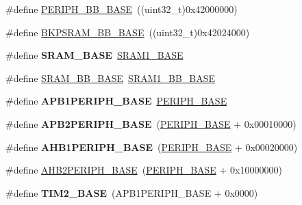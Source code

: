 \begin{DoxyCompactItemize}
\item 
\#define \hyperlink{group___peripheral__memory__map_gaed7efc100877000845c236ccdc9e144a}{P\-E\-R\-I\-P\-H\-\_\-\-B\-B\-\_\-\-B\-A\-S\-E}~((uint32\-\_\-t)0x42000000)
\item 
\#define \hyperlink{group___peripheral__memory__map_gaee19a30c9fa326bb10b547e4eaf4e250}{B\-K\-P\-S\-R\-A\-M\-\_\-\-B\-B\-\_\-\-B\-A\-S\-E}~((uint32\-\_\-t)0x42024000)
\item 
\hypertarget{group___peripheral__memory__map_ga05e8f3d2e5868754a7cd88614955aecc}{\#define {\bfseries S\-R\-A\-M\-\_\-\-B\-A\-S\-E}~\hyperlink{group___peripheral__memory__map_ga7d0fbfb8894012dbbb96754b95e562cd}{S\-R\-A\-M1\-\_\-\-B\-A\-S\-E}}\label{group___peripheral__memory__map_ga05e8f3d2e5868754a7cd88614955aecc}

\item 
\#define \hyperlink{group___peripheral__memory__map_gad3548b6e2f017f39d399358f3ac98454}{S\-R\-A\-M\-\_\-\-B\-B\-\_\-\-B\-A\-S\-E}~\hyperlink{group___peripheral__memory__map_gac4c4f61082e4b168f29d9cf97dc3ca5c}{S\-R\-A\-M1\-\_\-\-B\-B\-\_\-\-B\-A\-S\-E}
\item 
\hypertarget{group___peripheral__memory__map_ga45666d911f39addd4c8c0a0ac3388cfb}{\#define {\bfseries A\-P\-B1\-P\-E\-R\-I\-P\-H\-\_\-\-B\-A\-S\-E}~\hyperlink{group___peripheral__memory__map_ga9171f49478fa86d932f89e78e73b88b0}{P\-E\-R\-I\-P\-H\-\_\-\-B\-A\-S\-E}}\label{group___peripheral__memory__map_ga45666d911f39addd4c8c0a0ac3388cfb}

\item 
\hypertarget{group___peripheral__memory__map_ga25b99d6065f1c8f751e78f43ade652cb}{\#define {\bfseries A\-P\-B2\-P\-E\-R\-I\-P\-H\-\_\-\-B\-A\-S\-E}~(\hyperlink{group___peripheral__memory__map_ga9171f49478fa86d932f89e78e73b88b0}{P\-E\-R\-I\-P\-H\-\_\-\-B\-A\-S\-E} + 0x00010000)}\label{group___peripheral__memory__map_ga25b99d6065f1c8f751e78f43ade652cb}

\item 
\hypertarget{group___peripheral__memory__map_ga811a9a4ca17f0a50354a9169541d56c4}{\#define {\bfseries A\-H\-B1\-P\-E\-R\-I\-P\-H\-\_\-\-B\-A\-S\-E}~(\hyperlink{group___peripheral__memory__map_ga9171f49478fa86d932f89e78e73b88b0}{P\-E\-R\-I\-P\-H\-\_\-\-B\-A\-S\-E} + 0x00020000)}\label{group___peripheral__memory__map_ga811a9a4ca17f0a50354a9169541d56c4}

\item 
\#define \hyperlink{group___peripheral__memory__map_gaeedaa71d22a1948492365e2cd26cfd46}{A\-H\-B2\-P\-E\-R\-I\-P\-H\-\_\-\-B\-A\-S\-E}~(\hyperlink{group___peripheral__memory__map_ga9171f49478fa86d932f89e78e73b88b0}{P\-E\-R\-I\-P\-H\-\_\-\-B\-A\-S\-E} + 0x10000000)
\item 
\hypertarget{group___peripheral__memory__map_ga00d0fe6ad532ab32f0f81cafca8d3aa5}{\#define {\bfseries T\-I\-M2\-\_\-\-B\-A\-S\-E}~(A\-P\-B1\-P\-E\-R\-I\-P\-H\-\_\-\-B\-A\-S\-E + 0x0000)}\label{group___peripheral__memory__map_ga00d0fe6ad532ab32f0f81cafca8d3aa5}


\end{DoxyCompactItemize}

